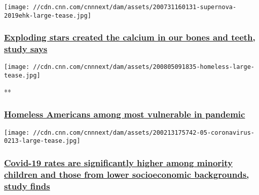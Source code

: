 \href{/2020/08/05/health/calcium-supernova-discovery-trnd-scn/index.html}{}

\texttt{[image: //cdn.cnn.com/cnnnext/dam/assets/200731160131-supernova-2019ehk-large-tease.jpg]}

\hypertarget{exploding-stars-created-the-calcium-in-our-bones-and-teeth-study-says}{%
\subsubsection{\texorpdfstring{\href{/2020/08/05/health/calcium-supernova-discovery-trnd-scn/index.html}{Exploding
stars created the calcium in our bones and teeth, study
says}}{Exploding stars created the calcium in our bones and teeth, study says}}\label{exploding-stars-created-the-calcium-in-our-bones-and-teeth-study-says}}

\href{/videos/health/2020/08/05/homeless-during-coronavirus-pandemic-newday-vpx.cnn}{}

\texttt{[image: //cdn.cnn.com/cnnnext/dam/assets/200805091835-homeless-large-tease.jpg]}

**

\hypertarget{homeless-americans-among-most-vulnerable-in-pandemic}{%
\subsubsection{\texorpdfstring{\href{/videos/health/2020/08/05/homeless-during-coronavirus-pandemic-newday-vpx.cnn}{Homeless
Americans among most vulnerable in
pandemic}}{Homeless Americans among most vulnerable in pandemic}}\label{homeless-americans-among-most-vulnerable-in-pandemic}}

\href{/2020/08/05/health/covid-rates-minority-study-trnd/index.html}{}

\texttt{[image: //cdn.cnn.com/cnnnext/dam/assets/200213175742-05-coronavirus-0213-large-tease.jpg]}

\hypertarget{covid-19-rates-are-significantly-higher-among-minority-children-and-those-from-lower-socioeconomic-backgrounds-study-finds}{%
\subsubsection{\texorpdfstring{\href{/2020/08/05/health/covid-rates-minority-study-trnd/index.html}{Covid-19
rates are significantly higher among minority children and those from
lower socioeconomic backgrounds, study
finds}}{Covid-19 rates are significantly higher among minority children and those from lower socioeconomic backgrounds, study finds}}\label{covid-19-rates-are-significantly-higher-among-minority-children-and-those-from-lower-socioeconomic-backgrounds-study-finds}}

